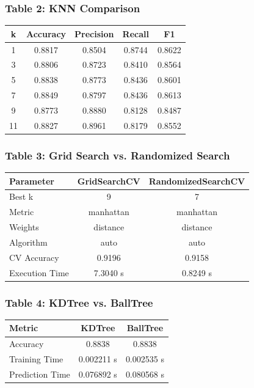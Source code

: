 \documentclass[12pt,a4paper]{article}
\begin{document}
\subsubsection*{Table 2: KNN Comparison}
\begin{tabular}{ccccc}
\toprule
k & Accuracy & Precision & Recall & F1 \\
\midrule
1 & 0.8817 & 0.8504 & 0.8744 & 0.8622 \\
3 & 0.8806 & 0.8723 & 0.8410 & 0.8564 \\
5 & 0.8838 & 0.8773 & 0.8436 & 0.8601 \\
7 & 0.8849 & 0.8797 & 0.8436 & 0.8613 \\
9 & 0.8773 & 0.8880 & 0.8128 & 0.8487 \\
11 & 0.8827 & 0.8961 & 0.8179 & 0.8552 \\
\bottomrule
\end{tabular}

\subsubsection*{Table 3: Grid Search vs. Randomized Search}
\begin{tabular}{lcc}
\toprule
Parameter & GridSearchCV & RandomizedSearchCV \\
\midrule
Best k & 9 & 7 \\
Metric & manhattan & manhattan \\
Weights & distance & distance \\
Algorithm & auto & auto \\
CV Accuracy & 0.9196 & 0.9158 \\
Execution Time & 7.3040 s & 0.8249 s \\
\bottomrule
\end{tabular}

\subsubsection*{Table 4: KDTree vs. BallTree}
\begin{tabular}{lcc}
\toprule
Metric & KDTree & BallTree \\
\midrule
Accuracy & 0.8838 & 0.8838 \\
Training Time & 0.002211 s & 0.002535 s \\
Prediction Time & 0.076892 s & 0.080568 s \\
\bottomrule
\end{tabular}
\end{document}
